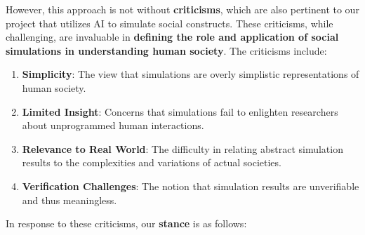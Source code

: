 \documentclass{article}
\begin{document}
However, this approach is not without \textbf{criticisms}, which are also pertinent to our project that utilizes AI to simulate social constructs. These criticisms, while challenging, are invaluable in \textbf{defining the role and application of social simulations in understanding human society}. The criticisms include:
\begin{enumerate}
\item\textbf{Simplicity}: The view that simulations are overly simplistic representations of human society.
\item\textbf{Limited Insight}: Concerns that simulations fail to enlighten researchers about unprogrammed human interactions.
\item\textbf{Relevance to Real World}: The difficulty in relating abstract simulation results to the complexities and variations of actual societies.
\item\textbf{Verification Challenges}: The notion that simulation results are unverifiable and thus meaningless.
\end{enumerate}

In response to these criticisms, our \textbf{stance} is as follows:
\end{document}
